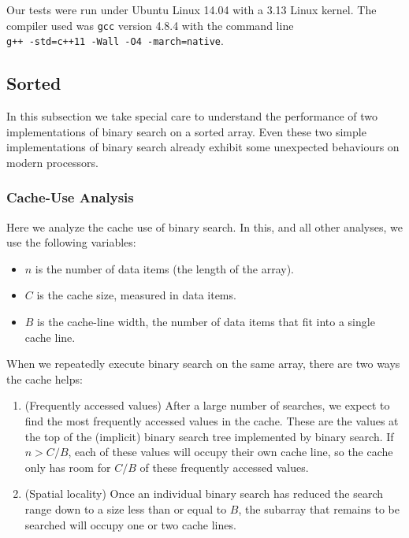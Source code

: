 \documentclass{patmorin}
\begin{document}
Our tests were run under Ubuntu Linux 14.04 with a 3.13 Linux kernel. The
compiler used was \texttt{gcc} version 4.8.4 with the command line \\
\texttt{g++ -std=c++11 -Wall -O4 -march=native}.

\subsection{Sorted}

In this subsection we take special care to understand the performance of
two implementations of binary search on a sorted array.  Even these two
simple implementations of binary search already exhibit some unexpected
behaviours on modern processors.

\subsubsection{Cache-Use Analysis}

Here we analyze the cache use of binary search. In this, and all other
analyses, we use the following variables:

\begin{itemize}
  \item $n$ is the number of data items (the length of the array).
  \item $C$ is the cache size, measured in data items.
  \item $B$ is the cache-line width, the number of data items that fit
        into a single cache line.
\end{itemize}

When we repeatedly execute binary search on the same array, there are
two ways the cache helps:
\begin{enumerate}
  \item (Frequently accessed values) After a large number of searches,
    we expect to find the most frequently accessed values in the cache.
    These are the values at the top of the (implicit) binary search tree
    implemented by binary search.  If $n>C/B$, each of these values will
    occupy their own cache line, so the cache only has room for $C/B$
    of these frequently accessed values.
  \item (Spatial locality) Once an individual binary search has reduced
    the search range down to a size less than or equal to $B$, the
    subarray that remains to be searched will occupy one or two
    cache lines. 
\end{enumerate}
\end{document}
